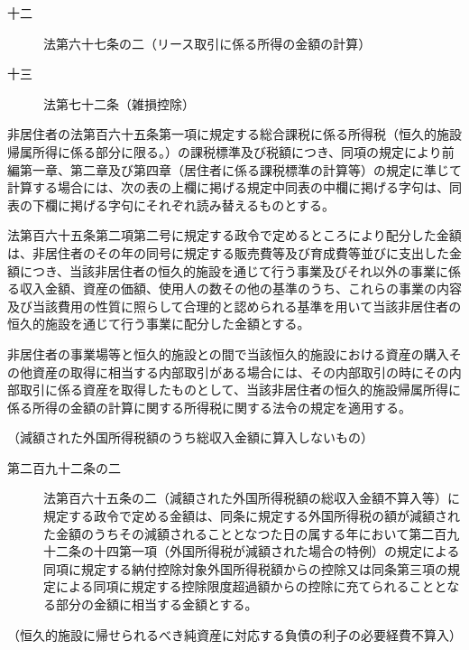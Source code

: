 \documentclass[twocolumn,a4j,10pt]{ltjtarticle}
\begin{document}
\begin{description}
\begin{description}
\item[十二]法第六十七条の二（リース取引に係る所得の金額の計算）
\item[十三]法第七十二条（雑損控除）
\end{description}
\item[\rensuji{2}]非居住者の法第百六十五条第一項に規定する総合課税に係る所得税（恒久的施設帰属所得に係る部分に限る。）の課税標準及び税額につき、同項の規定により前編第一章、第二章及び第四章（居住者に係る課税標準の計算等）の規定に準じて計算する場合には、次の表の上欄に掲げる規定中同表の中欄に掲げる字句は、同表の下欄に掲げる字句にそれぞれ読み替えるものとする。
\item[\rensuji{3}]法第百六十五条第二項第二号に規定する政令で定めるところにより配分した金額は、非居住者のその年の同号に規定する販売費等及び育成費等並びに支出した金額につき、当該非居住者の恒久的施設を通じて行う事業及びそれ以外の事業に係る収入金額、資産の価額、使用人の数その他の基準のうち、これらの事業の内容及び当該費用の性質に照らして合理的と認められる基準を用いて当該非居住者の恒久的施設を通じて行う事業に配分した金額とする。
\item[\rensuji{4}]非居住者の事業場等と恒久的施設との間で当該恒久的施設における資産の購入その他資産の取得に相当する内部取引がある場合には、その内部取引の時にその内部取引に係る資産を取得したものとして、当該非居住者の恒久的施設帰属所得に係る所得の金額の計算に関する所得税に関する法令の規定を適用する。
\end{description}
\noindent\hspace{10pt}（減額された外国所得税額のうち総収入金額に算入しないもの）
\begin{description}
\item[第二百九十二条の二]法第百六十五条の二（減額された外国所得税額の総収入金額不算入等）に規定する政令で定める金額は、同条に規定する外国所得税の額が減額された金額のうちその減額されることとなつた日の属する年において第二百九十二条の十四第一項（外国所得税が減額された場合の特例）の規定による同項に規定する納付控除対象外国所得税額からの控除又は同条第三項の規定による同項に規定する控除限度超過額からの控除に充てられることとなる部分の金額に相当する金額とする。
\end{description}
\noindent\hspace{10pt}（恒久的施設に帰せられるべき純資産に対応する負債の利子の必要経費不算入）
\end{document}

